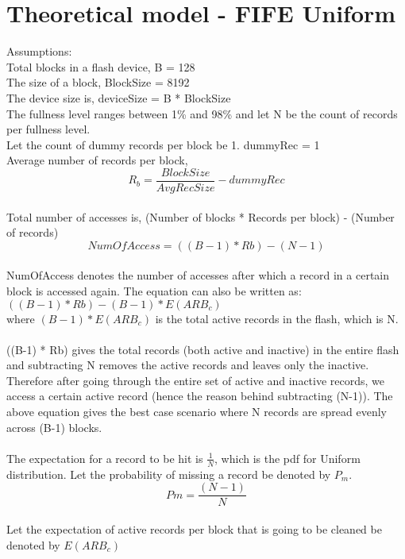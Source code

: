 \section{Theoretical model - FIFE Uniform}

Assumptions:\\
Total blocks in a flash device, B = 128\\
The size of a block, BlockSize = 8192\\
The device size is, deviceSize = B * BlockSize\\
The fullness level ranges between 1\% and 98\% and let N be the count of records per fullness level.\\
Let the count of dummy records per block be 1. dummyRec = 1\\
Average number of records per block, 
\begin{equation}R_b = \frac{BlockSize}{AvgRecSize} - dummyRec\end{equation}\\


Total number of accesses is, (Number of blocks * Records per block) - (Number of records)\\
\begin{equation}NumOfAccess = ((B-1) * Rb) -  (N-1)\end{equation}\\
NumOfAccess denotes the number of accesses after which a record in a certain block is accessed again. The equation can also be written as: $((B-1) * Rb) - (B-1) * E(ARB_c)$\\
where $(B-1) * E(ARB_c)$ is the total active records in the flash, which is N.\\
\\

((B-1) * Rb) gives the total records (both active and inactive) in the entire flash and subtracting N removes the active records and leaves only the inactive. Therefore after going through the entire set of active and inactive records, we access a certain active record (hence the reason behind subtracting (N-1)). The above equation gives the best case scenario where N records are spread evenly across (B-1) blocks.\\
\\

The expectation for a record to be hit is $\frac{1}{N}$, which is the pdf for Uniform distribution. Let the probability of missing a record be denoted by $P_m$. 
\begin{equation}Pm = \frac{(N-1)}{N}\end{equation}\\
Let the expectation of active records per block that is going to be cleaned be denoted by $E(ARB_c)$\\
\\

